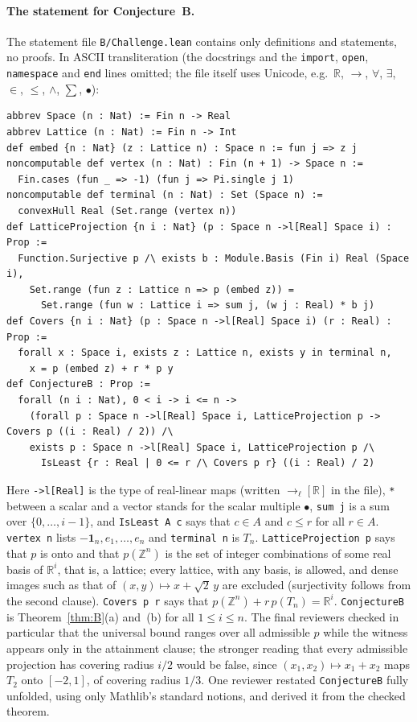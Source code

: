 \documentclass[11pt]{article}
\theoremstyle{definition}
\theoremstyle{remark}
\newcommand{\R}{\mathbb R}
\newcommand{\Z}{\mathbb Z}
\newcommand{\one}{\mathbf 1}
\begin{document}
{\paragraph{The statement for Conjecture~B.}
The statement file \texttt{B/Challenge.lean} contains only definitions and
statements, no proofs. In ASCII transliteration (the docstrings and the
\texttt{import}, \texttt{open}, \texttt{namespace} and \texttt{end} lines
omitted; the file itself uses Unicode, e.g.\ $\mathbb R$, $\to$, $\forall$,
$\exists$, $\in$, $\le$, $\wedge$, $\sum$, $\bullet$):
{\footnotesize
\begin{verbatim}
abbrev Space (n : Nat) := Fin n -> Real
abbrev Lattice (n : Nat) := Fin n -> Int
def embed {n : Nat} (z : Lattice n) : Space n := fun j => z j
noncomputable def vertex (n : Nat) : Fin (n + 1) -> Space n :=
  Fin.cases (fun _ => -1) (fun j => Pi.single j 1)
noncomputable def terminal (n : Nat) : Set (Space n) :=
  convexHull Real (Set.range (vertex n))
def LatticeProjection {n i : Nat} (p : Space n ->l[Real] Space i) : Prop :=
  Function.Surjective p /\ exists b : Module.Basis (Fin i) Real (Space i),
    Set.range (fun z : Lattice n => p (embed z)) =
      Set.range (fun w : Lattice i => sum j, (w j : Real) * b j)
def Covers {n i : Nat} (p : Space n ->l[Real] Space i) (r : Real) : Prop :=
  forall x : Space i, exists z : Lattice n, exists y in terminal n,
    x = p (embed z) + r * p y
def ConjectureB : Prop :=
  forall (n i : Nat), 0 < i -> i <= n ->
    (forall p : Space n ->l[Real] Space i, LatticeProjection p -> Covers p ((i : Real) / 2)) /\
    exists p : Space n ->l[Real] Space i, LatticeProjection p /\
      IsLeast {r : Real | 0 <= r /\ Covers p r} ((i : Real) / 2)
\end{verbatim}}
\noindent Here \texttt{->l[Real]} is the type of real-linear maps (written
$\to_{\ell}[\mathbb R]$ in the file), \texttt{*} between a scalar and a vector
stands for the scalar multiple $\bullet$, \texttt{sum j} is a sum over
$\{0,\dots,i-1\}$, and \texttt{IsLeast A c} says that $c\in A$ and $c\le r$
for all $r\in A$. \texttt{vertex n} lists $-\one_n,e_1,\dots,e_n$ and
\texttt{terminal n} is $T_n$. \texttt{LatticeProjection p} says that $p$ is
onto and that $p(\Z^n)$ is the set of integer combinations of some real basis
of $\R^i$, that is, a lattice; every lattice, with any basis, is allowed, and
dense images such as that of $(x,y)\mapsto x+\sqrt2\,y$ are excluded
(surjectivity follows from the second clause). \texttt{Covers p r} says that
$p(\Z^n)+r\,p(T_n)=\R^i$. \texttt{ConjectureB} is Theorem~\ref{thm:B}(a) and~(b)
for all $1\le i\le n$. The final reviewers checked in particular that the
universal bound ranges over all admissible $p$ while the witness appears only
in the attainment clause; the stronger reading that every admissible
projection has covering radius $i/2$ would be false, since
$(x_1,x_2)\mapsto x_1+x_2$ maps $T_2$ onto $[-2,1]$, of covering radius
$1/3$. One reviewer restated \texttt{ConjectureB} fully unfolded, using only
Mathlib's standard notions, and derived it from the checked theorem.

}
\end{document}
